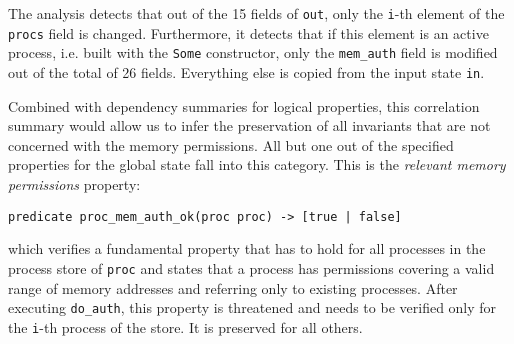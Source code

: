 \documentclass[11pt]{article}
\newcommand{\disp}[1]{\lstinline&#1&}
\begin{document}
\phantom{a}

\noindent The analysis detects 
that out of the 15 fields of \disp{out}, only the \disp{i}-th element of the 
\disp{procs} field is changed. Furthermore, it detects that if this element is an 
active process, i.e. built with the \disp{Some} constructor, only the \disp{mem_auth} 
field is modified out of the total of 26 fields. Everything else is copied from the input 
state \disp{in}.

Combined with dependency summaries for logical properties, this correlation summary 
would allow us to infer the preservation of all invariants that are not concerned 
with the memory permissions. All but one out of the specified properties for the global
state fall into this category. This is the \emph{relevant memory permissions} property:

\phantom{a}

\indent\indent\indent\indent \disp{predicate proc_mem_auth_ok(proc proc) -> [true | false]}
 
\phantom{a}

\noindent which verifies a fundamental property that has to hold for all processes in the 
process store of {\disp{proc}} and states that a process has permissions covering a valid 
range of memory addresses and referring only to existing processes.  
After executing \disp{do_auth}, this property is threatened and 
needs to be verified only for the \disp{i}-th process of the store. It is preserved for 
all others.
   
\end{document}
